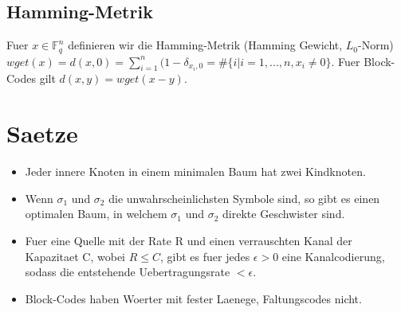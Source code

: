\documentclass[a4paper]{scrreprt}
\begin{document}
\subsection{Hamming-Metrik}
Fuer $x \in \mathbb{F}_q^n$ definieren wir die Hamming-Metrik (Hamming Gewicht, $L_0$-Norm) $wget(x) = d(x,0) = \sum_{i=1}^n(1-\delta_{x_i,0} = \#\{i|i=1,...,n,x_i \neq 0\}$.
Fuer Block-Codes gilt $d(x,y) = wget(x-y)$.


\section{Saetze}
\begin{itemize}
	\item Jeder innere Knoten in einem minimalen Baum hat zwei Kindknoten.
	\item Wenn $\sigma_1$ und $\sigma_2$ die unwahrscheinlichsten Symbole sind, so gibt es einen optimalen Baum, in welchem $\sigma_1$ und $\sigma_2$ direkte Geschwister sind.
	\item Fuer eine Quelle mit der Rate R und einen verrauschten Kanal der Kapazitaet C, wobei $R \le C$, gibt es fuer jedes $\epsilon > 0$ eine Kanalcodierung, sodass die entstehende Uebertragungsrate $< \epsilon$.
	\item Block-Codes haben Woerter mit fester Laenege, Faltungscodes nicht.
\end{itemize}
\end{document}
